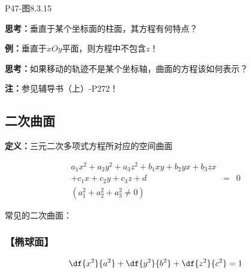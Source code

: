 \begin{center}
	
	P47-图8.3.15
\end{center}

{\bf 思考：}垂直于某个坐标面的柱面，其方程有何特点？

{\bf 例：}垂直于$xOy$平面，则方程中不包含$z$！

{\bf 思考：}如果移动的轨迹不是某个坐标轴，曲面的方程该如何表示？

{\bf 注：}参见辅导书（上）-P272！

\subsection{二次曲面}

{\bf 定义：}三元二次多项式方程所对应的空间曲面

\begin{eqnarray*}
	a_1x^2+a_2y^2+a_3z^2+b_1xy+b_2yx+b_3zx& &\\
	+c_1x+c_2y+c_3z+d & = & 0\\
	(a_1^2+a_2^2+a_3^2\ne 0)& &
\end{eqnarray*}

常见的二次曲面：

\subsubsection{【椭球面】}

$${\df{x^2}{a^2}+\df{y^2}{b^2}+\df{z^2}{c^2}=1}$$

\begin{center}
\end{center}

